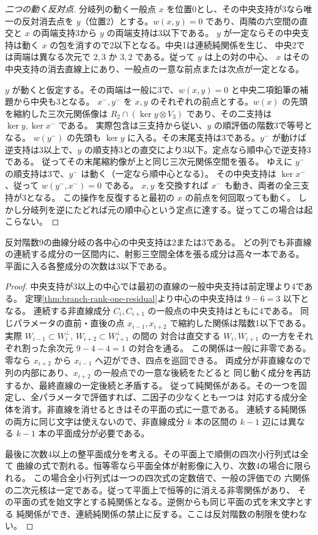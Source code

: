 \begin{proof}[二つの動く反対点]
分岐列の動く一般点 $x$ を位置0とし、その中央支持が3なら唯一の反対消去点を
$y$（位置2）とする。$w(x,y)=0$ であり、両隣の六空間の直交と
$x$ の両端支持3から $y$ の両端支持は3以下である。
$y$ が一定ならその中央支持は動く $x$ の包を消すので2以下となる。中央1は連続純関係を生じ、
中央2では両端は異なる次元で $2,3$ か $3,2$ である。従って $y$ は上の対の中心、
$x$ はその中央支持の消去直線上にあり、一般点の一意な前点または次点が一定となる。

$y$ が動くと仮定する。その両端は一般に3で、$w(x,y)=0$ と中央二項鉛筆の補題から中央も3となる。
$x^-,y^-$ を $x,y$ のそれぞれの前点とする。$w(x)$ の先頭を縮約した三次元関係像は
$R_2\cap(\ker y\otimes V_3)$ であり、その二支持は $\ker y,\ker x^-$ である。
実際包含は三支持から従い、$y$ の順評価の階数3で等号となる。
$w(y^-)$ の先頭も $\ker y$ に入る。その末尾支持は3である。$y^-$ が動けば
逆支持は3以上で、$y$ の順支持3との直交により3以下。定点なら順中心で逆支持3である。
従ってその末尾縮約像が上と同じ三次元関係空間を張る。
ゆえに $y^-$ の順支持は3で、$y^-$ は動く（一定なら順中心となる）。
その中央支持は $\ker x^-$、従って $w(y^-,x^-)=0$ である。
$x,y$ を交換すれば $x^-$ も動き、両者の全三支持が3となる。
この操作を反復すると最初の $x$ の前点を何回取っても動く。
しかし分岐列を逆にたどれば元の順中心という定点に達する。従ってこの場合は起こらない。
\end{proof}

\begin{corollary}\label{cor:rank-nine-nonlinear-corridors}
反対階数9の曲線分岐の各中心の中央支持は2または3である。
どの列でも非直線の連続する成分の一区間内に、射影三空間全体を張る成分は高々一本である。
平面に入る各整成分の次数は3以下である。
\end{corollary}
\begin{proof}
中央支持が3以上の中心では最初の直線の一般中央支持は前定理より4である。
定理\ref{thm:branch-rank-one-residual}より中心の中央支持は $9-6=3$ 以下となる。
連続する非直線成分 $C_i,C_{i+1}$ の一般点の中央支持はともに4である。
同じパラメータの直前・直後の点 $x_{i-1},x_{i+2}$ で縮約した関係は階数1以下である。
実際 $W_{i-1}\subset W_i^\perp$, $W_{i+2}\subset W_{i+1}^\perp$ の間の
対合は直交する $W_i,W_{i+1}$ の一方をそれぞれ割った余次元 $9-4-4=1$ の対合を通る。
この関係は一般に非零である。零なら $x_{i+2}$ から $x_{i-1}$ へ辺ができ、四点を巡回できる。
両成分が非直線なので列の内部にあり、$x_{i+2}$ の一般点での一意な後続をたどると
同じ動く成分を再訪するか、最終直線の一定後続と矛盾する。
従って純関係がある。その一つを固定し、全パラメータで評価すれば、二因子の少なくとも一つは
対応する成分全体を消す。非直線を消せるときはその平面の式に一意である。
連続する純関係の両方に同じ文字は使えないので、非直線成分 $k$ 本の区間の
$k-1$ 辺には異なる $k-1$ 本の平面成分が必要である。

最後に次数4以上の整平面成分を考える。その平面上で順側の四次小行列式は全て
曲線の式で割れる。恒等零なら平面全体が射影像に入り、次数4の場合に限られる。
この場合全小行列式は一つの四次式の定数倍で、一般の評価での
六関係の二次元核は一定である。従って平面上で恒等的に消える非零関係があり、
その平面の式を始文字とする純関係となる。逆側からも同じ平面の式を末文字とする
純関係ができ、連続純関係の禁止に反する。ここは反対階数の制限を使わない。
\end{proof}

